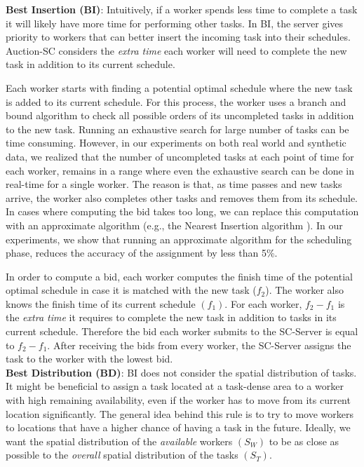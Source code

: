 \noindent \textbf{Best Insertion (BI)}: 
Intuitively, if a worker spends less time to complete a task it will likely have more time for performing other tasks. In BI, the server gives priority to workers that can better insert the incoming task into their schedules. Auction-SC considers the \textit{extra time} each worker will need to complete the new task in addition to its current schedule.

Each worker starts with finding a potential optimal schedule where the new task is added to its current schedule. For this process, the worker uses a branch and bound algorithm to check all possible orders of its uncompleted tasks in addition to the new task. Running an exhaustive search for large number of tasks can be time consuming. However, in our experiments on both real world and synthetic data, we realized that the number of uncompleted tasks at each point of time for each worker, remains in a range where even the exhaustive search can be done in real-time for a single worker. The reason is that, as time passes and new tasks arrive, the worker also completes other tasks and removes them from its schedule. In cases where computing the bid takes too long, we can replace this computation with an approximate algorithm (e.g., the Nearest Insertion algorithm \cite{Rosenkrantz74}). In our experiments, we show that running an approximate algorithm for the scheduling phase, reduces the accuracy of the assignment by less than 5\%.

In order to compute a bid, each worker computes the finish time of the potential optimal schedule in case it is matched with the new task ($f_2$). The worker also knows the finish time of its current schedule $(f_1)$. For each worker, $f_2-f_1$ is the \textit{extra time} it requires to complete the new task in addition to tasks in its current schedule. Therefore the bid each worker submits to the SC-Server is equal to $f_2 - f_1$. After receiving the bids from every worker, the SC-Server assigns the task to the worker with the lowest bid.\\

\noindent \textbf{Best Distribution (BD)}: 
BI does not consider the spatial distribution of tasks. It might be beneficial to assign a task located at a task-dense area to a worker with high remaining availability, even if the worker has to move from its current location significantly. The general idea behind this rule is to try to move workers to locations that have a higher chance of having a task in the future. Ideally, we want the spatial distribution of the \textit{available} workers $(S_W)$ to be as close as possible to the \textit{overall} spatial distribution of the tasks $(S_T)$.

